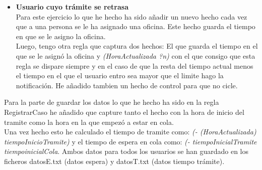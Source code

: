 \documentclass[10pt,spanish]{article}
\begin{document}
\begin{itemize}
		\item \textbf{Usuario cuyo trámite se retrasa}\\
		Para este ejercicio lo que he hecho ha sido añadir un nuevo hecho cada vez que a una persona se le ha asignado una oficina. Este hecho guarda el tiempo en que se le asigno la oficina.\\
		Luego, tengo otra regla que captura dos hechos: El que guarda el tiempo en el que se le asignó la oficina y \textit{(HoraActualizada ?n)} con el que consigo que esta regla se dispare siempre y en el caso de que la resta del tiempo actual menos el tiempo en el que el usuario entro sea mayor que el limite hago la notificación.
		He añadido tambien un hecho de control para que no cicle.
	\end{itemize}
	Para la parte de guardar los datos lo que he hecho ha sido en la regla RegistrarCaso he añadido que capture tanto el hecho con la hora de inicio del tramite como la hora en la que empezó a estar en cola. \\
	Una vez hecho esto he calculado el tiempo de tramite como: \textit{(- (HoraActualizada) tiempoInicioTramite)} y el tiempo de espera en cola como: \textit{(- tiempoInicialTramite tiempoinicialCola}.
	Ambos datos para todos los usuarios se han guardado en los ficheros datosE.txt (datos espera) y datosT.txt (datos tiempo trámite).
	\pagebreak
\end{document}
